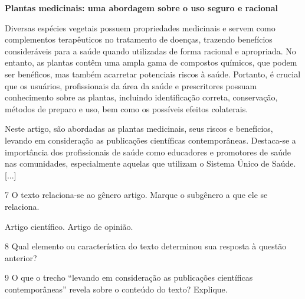 \begin{myquote}
\centering\textbf{Plantas medicinais: uma abordagem sobre o uso seguro e racional}


Diversas espécies vegetais possuem propriedades medicinais e servem como
complementos terapêuticos no tratamento de doenças, trazendo benefícios
consideráveis para a saúde quando utilizadas de forma racional e
apropriada. No entanto, as plantas contêm uma ampla gama de compostos
químicos, que podem ser benéficos, mas também acarretar potenciais
riscos à saúde. Portanto, é crucial que os usuários, profissionais da
área da saúde e prescritores possuam conhecimento sobre as plantas,
incluindo identificação correta, conservação, métodos de preparo e
uso, bem como os possíveis efeitos colaterais.

Neste artigo, são abordadas as plantas medicinais, seus riscos e
benefícios, levando em consideração as publicações científicas
contemporâneas. Destaca-se a importância dos profissionais de saúde como
educadores e promotores de saúde nas comunidades, especialmente aquelas
que utilizam o Sistema Único de Saúde. [...]

\end{myquote}

\num{7} O texto relaciona-se ao gênero artigo. Marque o subgênero a que
ele se relaciona.

\begin{boxlist}
 Artigo científico.
 Artigo de opinião.
\end{boxlist}

\num{8} Qual elemento ou característica do texto determinou sua resposta à questão anterior?


\num{9} O que o trecho ``levando em consideração as publicações
científicas contemporâneas'' revela sobre o conteúdo do texto? Explique.


